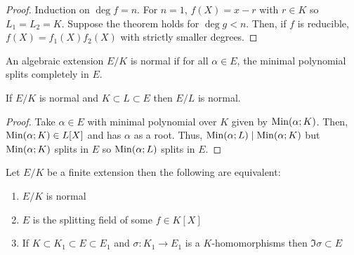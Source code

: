 \documentclass[12pt]{extarticle}
\begin{document}
\begin{proof}
Induction on $\deg{f} = n$. For $n = 1$, $f(X) = x - r$ with $r \in K$ so $L_1 = L_2 = K$. Suppose the theorem holds for $\deg{g} < n$. Then, if $f$ is reducible, $f(X) = f_1(X) f_2(X)$ with strictly smaller degrees. 
\end{proof}

\begin{definition}
An algebraic extension $E/K$ is normal if for all $\alpha \in E$, the minimal polynomial splits completely in $E$.
\end{definition} 

\begin{lemma}
If $E/K$ is normal and $K \subset L \subset E$ then $E/L$ is normal.
\end{lemma}

\begin{proof}
Take $\alpha \in E$ with minimal polynomial over $K$ given by $\mathrm{Min}(\alpha;K)$. Then, $\mathrm{Min}(\alpha;K) \in L[X]$ and has $\alpha$ as a root. Thus, $\mathrm{Min}(\alpha;L) \mid \mathrm{Min}(\alpha;K)$ but $\mathrm{Min}(\alpha;K)$ splits in $E$ so $\mathrm{Min}(\alpha;L)$ splits in $E$. 
\end{proof}

\begin{theorem}
Let $E/K$ be a finite extension then the following are equivalent:
\begin{enumerate}
\item $E/K$ is normal
\item $E$ is the splitting field of some $f \in K[X]$
\item If $K \subset K_1 \subset E \subset E_1$ and $\sigma : K_1 \to E_1$ is a $K$-homomorphisms then $\Im{\sigma} \subset E$
\end{enumerate}
\end{theorem}
\end{document}
